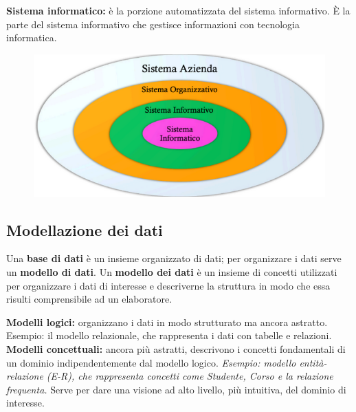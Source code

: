 \documentclass{article}
\begin{document}
\begin{itemize}
    \textbf{Sistema informatico:} è la porzione automatizzata del sistema informativo. È la parte del sistema informativo che gestisce informazioni con tecnologia informatica. 
    \begin{figure}[h!]
        \centering
        \includegraphics[width=0.5\linewidth]{ger1.png}
    \end{figure}
\end{itemize}
\subsection{Modellazione dei dati}
Una \textbf{base di dati} è un insieme organizzato di dati; per organizzare i dati serve un \textbf{modello di dati}. Un \textbf{modello dei dati} è un insieme di concetti utilizzati per organizzare i dati di interesse e descriverne la struttura in modo che essa risulti comprensibile ad un elaboratore.

\textbf{Modelli logici:} organizzano i dati in modo strutturato ma ancora astratto. Esempio: il modello relazionale, che rappresenta i dati con tabelle e relazioni.
\textbf{Modelli concettuali:} ancora più astratti, descrivono i concetti fondamentali di un dominio
indipendentemente dal modello logico. \textit{Esempio: modello entità-relazione (E-R), che rappresenta concetti come Studente, Corso e la relazione frequenta. }
Serve per dare una visione ad alto livello, più intuitiva, del dominio di interesse.
\end{document}
